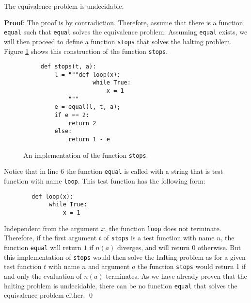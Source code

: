 \begin{Theorem}
The equivalence problem is undecidable.  
\end{Theorem}

\noindent
\textbf{Proof}:
The proof is by contradiction.  Therefore, assume that there is a function \texttt{equal}
such that \texttt{equal} solves the equivalence problem.  Assuming \texttt{equal} exists, we will
then proceed to define a function \texttt{stops} that solves the halting problem.
Figure \ref{fig:stops} shows this construction of the function \texttt{stops}.


\begin{figure}[!h]
  \centering
\begin{verbatim}
     def stops(t, a):
         l = """def loop(x): 
                    while True:
                        x = 1
             """ 
         e = equal(l, t, a);
         if e == 2:
             return 2
         else:
             return 1 - e
\end{verbatim}
  \vspace*{-0.3cm}
  \caption{An implementation of the function \texttt{stops}.}
  \label{fig:stops}
\end{figure}

Notice that in line 6 the function \texttt{equal} is called with a string that is test function with
name \texttt{loop}.  This test function has the following form:
\begin{verbatim}
        def loop(x): 
             while True:
                 x = 1
\end{verbatim}
Independent from the argument $x$, the function \texttt{loop} does not terminate.
Therefore, if the first argument $t$ of \texttt{stops} is a test function with name $n$, 
the function \texttt{equal} will return $1$ if $n(a)$ diverges, and will return $0$ otherwise.
But this implementation of \texttt{stops} would then solve the halting problem as
for a given test function $t$ with name $n$ and argument $a$ the function \texttt{stops} would
return 1 if and only the evaluation of $n(a)$ terminates.  As we have already proven that the
halting problem is undecidable, there can be no function \texttt{equal} that solves the equivalence
problem either.
\qed

